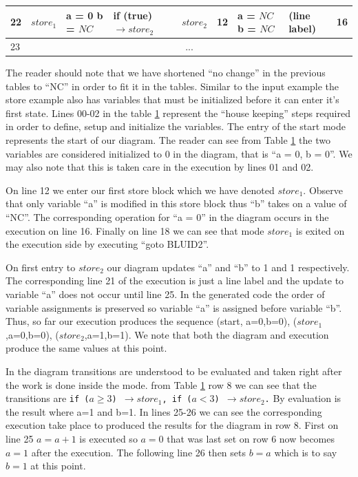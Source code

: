 \begin{table}[htcb]
\begin{tabular}{|p{} | p{} | p{} | p{} | p{} | p{} | p{} | p{} | p{} |}
			\hline
			22&$store_1$			&	a = 0 \newline b = $NC$		&	if (true) $\rightarrow store_2$ & $store_2$			&	12					&	a = $NC$ \newline b = $NC$	&	(line label)				&	16	\\
			\hline
			23&\multicolumn{8}{|c|}{...}\\
			\hline
		\end{tabular}
	\label{table:StoreExecCombined}
\end{table}

The reader should note that we have shortened ``no change'' in the previous tables to ``NC'' in order to fit
it in the tables.  Similar to the input example the store example also has variables that must be initialized 
before it can enter it's first state. Lines 00-02 in the table \ref{table:StoreExecCombined} represent the 
``house keeping'' steps required in order to define, setup and initialize the variables. The entry of the start
mode represents the start of our diagram. The reader can see from Table \ref{table:StoreExecCombined} the two
variables are considered initialized to 0 in the diagram, that is ``a = 0, b = 0''. We may also note that this
is taken care in the execution by lines 01 and 02.

On line 12 we enter our first store block which we
have denoted $store_1$. Observe that only variable ``a'' is modified in this store block thus ``b'' takes on 
a value of ``NC''. The corresponding operation for ``a = 0'' in the diagram occurs in the execution on line 16.
Finally on line 18 we can see that mode $store_1$ is exited on the execution side by executing ``goto BLUID2''.

On first entry to $store_2$ our diagram updates ``a'' and ``b'' to 1 and 1 respectively. The corresponding line 21 of
the execution is just a line label and the update to variable ``a'' does not occur until line 25. In the generated
code the order of variable assignments is preserved so variable ``a'' is assigned before variable ``b''. Thus, so
far our execution produces the sequence (start, {a=0,b=0}), ($store_1$,{a=0,b=0}), ($store_2$,{a=1,b=1}). We note that
both the diagram and execution produce the same values at this point.

In the diagram transitions are understood to be evaluated and taken right after the work is done inside the mode.
from Table \ref{table:StoreExecCombined} row 8 we can see that the transitions are 
\texttt{if ($a \geq 3$) $\rightarrow store_1$, if ($a < 3$) $\rightarrow store_2$.} 
By evaluation  is the result where a=1 and b=1. 
In lines 25-26 we can see the corresponding execution take place to
produced the results for the diagram in row 8. 
First on line 25 $a = a + 1$ is executed so $a = 0$ that was last set
on row 6 now becomes $a = 1$ after the execution. 
The following line 26 then sets $b = a$ which is to say $b = 1$ at
this point.

